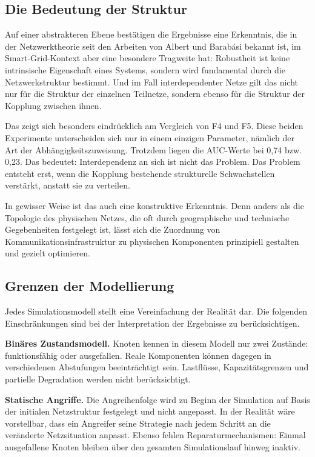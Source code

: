 \subsection{Die Bedeutung der Struktur}

Auf einer abstrakteren Ebene bestätigen die Ergebnisse eine Erkenntnis, die in der Netzwerktheorie seit den Arbeiten von Albert und Barabási bekannt ist, im Smart-Grid-Kontext aber eine besondere Tragweite hat: Robustheit ist keine intrinsische Eigenschaft eines Systems, sondern wird fundamental durch die Netzwerkstruktur bestimmt. Und im Fall interdependenter Netze gilt das nicht nur für die Struktur der einzelnen Teilnetze, sondern ebenso für die Struktur der Kopplung zwischen ihnen.

Das zeigt sich besonders eindrücklich am Vergleich von F4 und F5. Diese beiden Experimente unterscheiden sich nur in einem einzigen Parameter, nämlich der Art der Abhängigkeitszuweisung. Trotzdem liegen die AUC-Werte bei 0,74 bzw. 0,23. Das bedeutet: Interdependenz an sich ist nicht das Problem. Das Problem entsteht erst, wenn die Kopplung bestehende strukturelle Schwachstellen verstärkt, anstatt sie zu verteilen.

In gewisser Weise ist das auch eine konstruktive Erkenntnis. Denn anders als die Topologie des physischen Netzes, die oft durch geographische und technische Gegebenheiten festgelegt ist, lässt sich die Zuordnung von Kommunikationsinfrastruktur zu physischen Komponenten prinzipiell gestalten und gezielt optimieren.

\subsection{Grenzen der Modellierung}

Jedes Simulationsmodell stellt eine Vereinfachung der Realität dar. Die folgenden Einschränkungen sind bei der Interpretation der Ergebnisse zu berücksichtigen.

\textbf{Binäres Zustandsmodell.} Knoten kennen in diesem Modell nur zwei Zustände: funktionsfähig oder ausgefallen. Reale Komponenten können dagegen in verschiedenen Abstufungen beeinträchtigt sein. Lastflüsse, Kapazitätsgrenzen und partielle Degradation werden nicht berücksichtigt.

\textbf{Statische Angriffe.} Die Angreihenfolge wird zu Beginn der Simulation auf Basis der initialen Netzstruktur festgelegt und nicht angepasst. In der Realität wäre vorstellbar, dass ein Angreifer seine Strategie nach jedem Schritt an die veränderte Netzsituation anpasst. Ebenso fehlen Reparaturmechanismen: Einmal ausgefallene Knoten bleiben über den gesamten Simulationslauf hinweg inaktiv.

